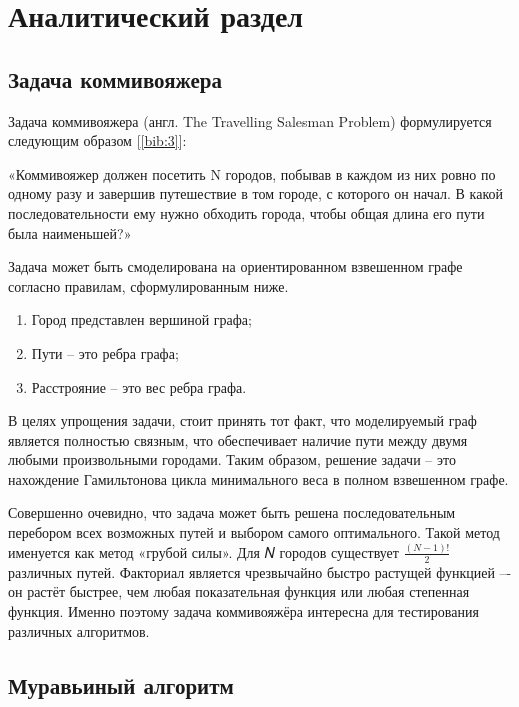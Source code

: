 \chapter{Аналитический раздел}
\label{cha:analytical}
    \section{Задача коммивояжера}

    \par Задача коммивояжера (англ. The Travelling Salesman Problem) формулируется следующим образом [\ref{bib:3}]:
	\par «Коммивояжер должен посетить N городов, побывав в каждом из них ровно по одному разу и завершив путешествие в том городе, с которого он начал. В какой последовательности ему нужно обходить города, чтобы общая длина его пути была наименьшей?»
	\par Задача может быть смоделирована на ориентированном взвешенном графе согласно правилам, сформулированным ниже.
	\begin{enumerate}
    	\item Город представлен вершиной графа;
    	\item Пути -- это ребра графа;
    	\item Расстрояние -- это вес ребра графа.
    \end{enumerate}

    \par В целях упрощения задачи, стоит принять тот факт, что моделируемый граф является полностью связным, что обеспечивает наличие пути между двумя любыми произвольными городами. Таким образом, решение задачи -- это нахождение Гамильтонова цикла минимального веса в полном взвешенном графе.

    \par Совершенно очевидно, что задача может быть решена последовательным перебором всех возможных путей и выбором самого оптимального. Такой метод именуется как метод «грубой силы». Для 𝑁 городов существует \begin{math} \frac{(N-1)!}{2} \end{math} различных путей. Факториал является чрезвычайно быстро растущей функцией –- он растёт быстрее, чем любая показательная функция или любая степенная функция. Именно поэтому задача коммивояжёра интересна для тестирования различных алгоритмов.

    \section{Муравьиный алгоритм}
